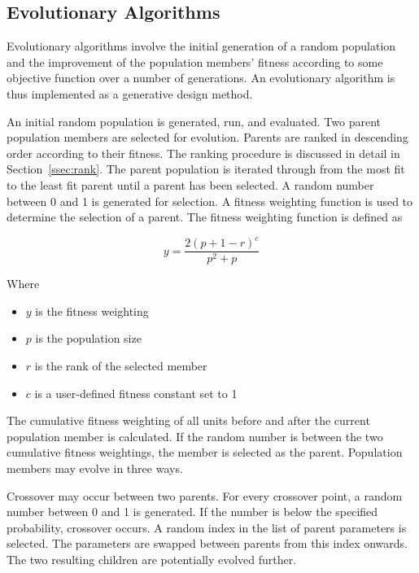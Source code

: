 \subsection{Evolutionary Algorithms}
\label{ssec:ea}

Evolutionary algorithms involve the initial generation of a random population and the improvement of the population members' fitness according to some objective function over a number of generations. An evolutionary algorithm is thus implemented as a generative design method.

An initial random population is generated, run, and evaluated. Two parent population members are selected for evolution. Parents are ranked in descending order according to their fitness. The ranking procedure is discussed in detail in Section~\ref{ssec:rank}. The parent population is iterated through from the most fit to the least fit parent until a parent has been selected. A random number between 0 and 1 is generated for selection. A fitness weighting function is used to determine the selection of a parent. The fitness weighting function is defined as

\begin{equation}
	y=\frac{2\left ( p+1-r \right )^{c}}{p^{2}+p}
\end{equation}

Where

\begin{itemize}
	\item $y$ is the fitness weighting
	\item $p$ is the population size
	\item $r$ is the rank of the selected member
	\item $c$ is a user-defined fitness constant set to 1
\end{itemize}

The cumulative fitness weighting of all units before and after the current population member is calculated. If the random number is between the two cumulative fitness weightings, the member is selected as the parent. Population members may evolve in three ways.

Crossover may occur between two parents. For every crossover point, a random number between 0 and 1 is generated. If the number is below the specified probability, crossover occurs. A random index in the list of parent parameters is selected. The parameters are swapped between parents from this index onwards. The two resulting children are potentially evolved further.

